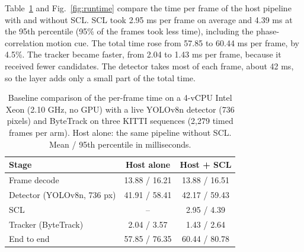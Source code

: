 \documentclass[pdflatex,sn-mathphys-num,iicol]{sn-jnl}
\newcommand{\scl}{SCL}
\begin{document}
Table~\ref{tab:runtime} and Fig.~\ref{fig:runtime} compare the time per frame
of the host pipeline with and without \scl{}. \scl{} took 2.95 ms per
frame on average and 4.39 ms at the 95th percentile (95\% of the frames took
less time), including the
phase-correlation motion cue. The total time rose from 57.85 to 60.44 ms
per frame, by 4.5\%. The tracker became faster, from 2.04 to 1.43 ms per
frame, because it received fewer candidates. The detector takes most of each
frame, about 42 ms, so the layer adds only a small part of the total time.

\begin{table}[t]
\caption{Baseline comparison of the per-frame time on a 4-vCPU Intel Xeon
(2.10 GHz, no GPU) with a live YOLOv8n detector (736 pixels) and ByteTrack on
three KITTI sequences (2,279 timed frames per arm). Host alone: the same
pipeline without \scl{}. Mean / 95th percentile in milliseconds.}
\label{tab:runtime}
\centering\footnotesize
\setlength{\tabcolsep}{4pt}
\begin{tabular}{@{}lcc@{}}
\toprule
Stage & Host alone & Host + \scl{}\\
\midrule
Frame decode & 13.88 / 16.21 & 13.88 / 16.51\\
Detector (YOLOv8n, 736 px) & 41.91 / 58.41 & 42.17 / 59.43\\
\scl{} & -- & 2.95 / 4.39\\
Tracker (ByteTrack) & 2.04 / 3.57 & 1.43 / 2.64\\
End to end & 57.85 / 76.35 & 60.44 / 80.78\\
\bottomrule
\end{tabular}
\end{table}
\end{document}
